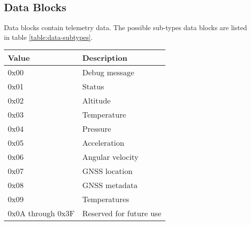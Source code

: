 \subsection{Data Blocks}

Data blocks contain telemetry data. The possible sub-types data blocks are listed in table \ref{table:data-subtypes}.

\begin{table*}[htb]
    \centering
    \begin{tabular}{@{}ll@{}}
        \toprule
        Value             & Description             \\
        \midrule
        0x00              & Debug message           \\
        0x01              & Status                  \\
        0x02              & Altitude                \\
        0x03              & Temperature             \\
        0x04              & Pressure                \\
        0x05              & Acceleration            \\
        0x06              & Angular velocity        \\
        0x07              & GNSS location           \\
        0x08              & GNSS metadata           \\
        0x09              & Temperatures            \\
        0x0A through 0x3F & Reserved for future use \\
        \bottomrule
    \end{tabular}
    \caption{Data Block Subtypes}
    \label{table:data-subtypes}
\end{table*}










